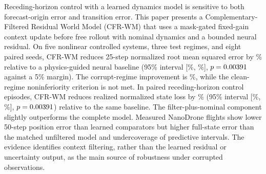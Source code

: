 Receding-horizon control with a learned dynamics model is sensitive to both
forecast-origin error and transition error. This paper presents a
Complementary-Filtered Residual World Model (CFR-WM) that uses a mask-gated
fixed-gain context update before free rollout with nominal dynamics and a
bounded neural residual. On five nonlinear controlled systems, three test
regimes, and eight paired seeds, CFR-WM reduces 25-step normalized root mean
squared error by \PrimaryImprovement\% relative to a physics-guided neural
baseline (95\% interval [\PrimaryRelativeCILow\%,
\PrimaryRelativeCIHigh\%], $p=0.00391$ against a 5\% margin). The
corrupt-regime improvement is \CorruptImprovement\%, while the clean-regime
noninferiority criterion is not met. In \ClosedLoopEpisodes{} paired
receding-horizon control episodes, CFR-WM reduces realized normalized state
loss by \ClosedLoopImprovement\% (95\% interval [\ClosedLoopCILow\%,
\ClosedLoopCIHigh\%], $p=0.00391$) relative to the same baseline.
The filter-plus-nominal component slightly outperforms the complete model.
Measured NanoDrone flights show lower 50-step position error than learned
comparators but higher full-state error than the matched unfiltered model and
undercoverage of predictive intervals. The evidence identifies context
filtering, rather than the learned residual or uncertainty output, as the main
source of robustness under corrupted observations.
